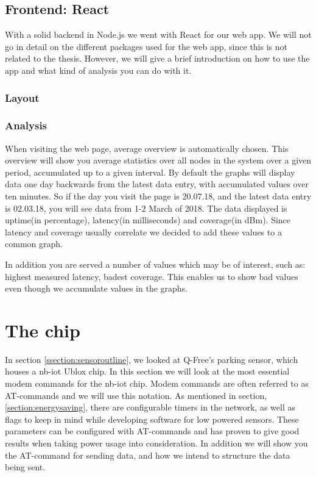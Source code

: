 \documentclass[USenglish]{ifimaster}  %
\begin{document}
\subsection{Frontend: React}
With a solid backend in Node.js we went with React for our web app. We will not go in detail on the different packages used for the web app, since this is not related to the thesis. However, we will give a brief introduction on how to use the app and what kind of analysis you can do with it.

\subsubsection{Layout}

\subsubsection{Analysis}
When visiting the web page, average overview is automatically chosen. This overview will show you average statistics over all nodes in the system over a given period, accumulated up to a given interval. By default the graphs will display data one day backwards from the latest data entry, with accumulated values over ten minutes. So if the day you visit the page is 20.07.18, and the latest data entry is 02.03.18, you will see data from 1-2 March of 2018. The data displayed is uptime(in percentage), latency(in milliseconds) and coverage(in dBm). Since latency and coverage usually correlate we decided to add these values to a common graph.

In addition you are served a number of values which may be of interest, such as: highest measured latency, badest coverage. This enables us to show bad values even though we accumulate values in the graphs.

\section{The chip}
In section \vref{ssection:sensoroutline}, we looked at Q-Free's parking sensor, which houses a \acrshort{nb-iot} Ublox chip. In this section we will look at the most essential modem commands for the \acrshort{nb-iot} chip. Modem commands are often referred to as AT-commands and we will use this notation. As mentioned in section, \vref{section:energysaving}, there are configurable timers in the network, as well as flags to keep in mind while developing software for low powered sensors. These parameters can be configured with AT-commands and has proven to give good results when taking power usage into consideration. In addition we will show you the AT-command for sending data, and how we intend to structure the data being sent.
\end{document}
